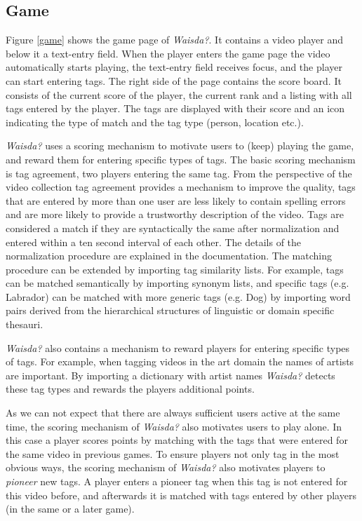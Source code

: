 \subsection{Game}\label{sec:waisda-game}

Figure \ref{game} shows the game page of \textit{Waisda?}. It contains a video player and below it a text-entry field. When the player enters the game page the video automatically starts playing, the text-entry field receives focus, and the player can start entering tags. The right side of the page contains the score board. It consists of the current score of the player, the current rank and a listing with all tags entered by the player.
The tags are displayed with their score and an icon indicating the type of match and the tag type (person, location etc.).

\textit{Waisda?} uses a scoring mechanism to motivate users to (keep) playing the game, and reward them for entering specific types of tags. The basic scoring mechanism is tag agreement, two players entering the same tag. From the perspective of the video collection tag agreement provides a mechanism to improve the quality, tags that are entered by more than one user are less likely to contain spelling errors and are more likely to provide a trustworthy description of the video. Tags are considered a match if they are syntactically
the same after normalization and entered within a ten second interval of each other. The details of the normalization procedure are explained in the documentation. The matching procedure can be extended by importing tag similarity lists. For example, tags can be matched semantically by importing synonym lists, and specific tags (e.g. Labrador) can be matched with more generic tags (e.g. Dog) by importing word pairs derived from the hierarchical structures of linguistic or domain specific thesauri.

\textit{Waisda?} also contains a mechanism to reward players for entering specific types of tags. For example, when tagging videos in the art domain the names of artists are important. By importing a dictionary with artist names \textit{Waisda?} detects these tag types and rewards the players additional points.

As we can not expect that there are always sufficient users active at the same time, the scoring mechanism of \textit{Waisda?} also motivates users to play alone. In this case a player scores points by matching with the tags that were entered for the same video in previous games. To ensure players not
only tag in the most obvious ways, the scoring mechanism of \textit{Waisda?} also motivates players to \textit{pioneer} new tags. A player enters a pioneer tag when this tag is not entered for this video before, and afterwards it is matched with tags entered by other players (in the same or a later game).

